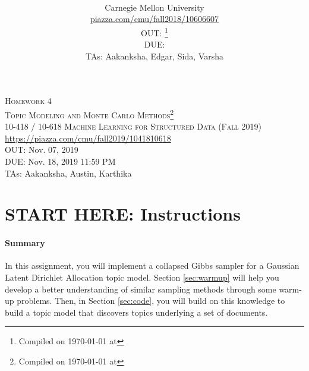 \documentclass[11pt,addpoints,answers]{exam}
\title{\textsc{\hwName}} %
\author{\courseName\\
  Carnegie Mellon University \\
\url{piazza.com/cmu/fall2018/10606607} \\
OUT: \outDate{}\thanks{Compiled on \today{} at \currenttime{}} \\
DUE: \dueDate{} \\ 
TAs: Aakanksha, Edgar, Sida, Varsha}
\date{}
\date{}
\numberwithin{equation}{section} %
\numberwithin{figure}{section} %
\numberwithin{table}{section} %
\newcommand{\courseNum}{10-418 / 10-618}
\newcommand{\courseName}{Machine Learning for Structured Data}
\newcommand{\courseSem}{Fall 2019}
\newcommand{\piazzaUrl}{\url{https://piazza.com/cmu/fall2019/1041810618}}
\newcommand{\hwNum}{Homework 4}
\newcommand{\hwTopic}{Topic Modeling and Monte Carlo Methods}
\newcommand{\outDate}{Nov. 07, 2019}
\newcommand{\dueDate}{Nov. 18, 2019 11:59 PM}
\newcommand{\taNames}{Aakanksha, Austin, Karthika}
\begin{document}
\section*{}
\begin{center}
  \textsc{\LARGE \hwNum} \\
  \textsc{\LARGE \hwTopic\footnote{Compiled on \today{} at \currenttime{}}} \\
  \vspace{1em}
  \textsc{\large \courseNum{} \courseName{} (\courseSem)} \\
  \piazzaUrl\\
  \vspace{1em}
  OUT: \outDate \\
  DUE: \dueDate \\
  TAs: \taNames
\end{center}


\section*{START HERE: Instructions}

\begin{notebox}
\paragraph{Summary} In this assignment, you will implement a collapsed Gibbs sampler for a Gaussian Latent Dirichlet Allocation topic model. Section \ref{sec:warmup} will help you develop a better understanding of similar sampling methods through some warm-up problems. Then, in Section \ref{sec:code}, you will build on this knowledge to build a topic model that discovers topics underlying a set of documents. 
\end{notebox}
\end{document}
